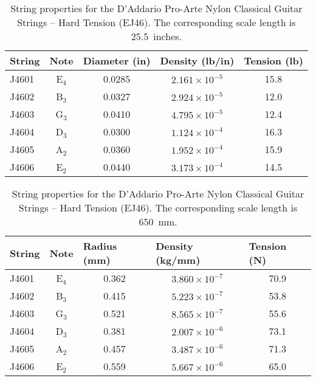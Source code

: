\begin{table}[htbp]
  \centering
  \caption{\label{tbl:ej46_ips} String properties for the D'Addario Pro-Arte Nylon Classical Guitar Strings -- Hard Tension (EJ46). The corresponding scale length is 25.5~inches.}
    \begin{tabular}{lcccc}
    \hline \hline
    String  & Note  & \multicolumn{1}{l}{Diameter (in)} & \multicolumn{1}{l}{Density (lb/in)} & \multicolumn{1}{l}{Tension (lb)} \\
    \hline
    J4601 & E$_4$  & 0.0285 & $2.161 \times 10^{-5}$ & 15.8 \\
    J4602 & B$_3$  & 0.0327 & $2.924 \times 10^{-5}$ & 12.0 \\
    J4603 & G$_3$  & 0.0410 & $4.795 \times 10^{-5}$ & 12.4 \\
    J4604 & D$_3$  & 0.0300 & $1.124 \times 10^{-4}$ & 16.3 \\
    J4605 & A$_2$  & 0.0360 & $1.952 \times 10^{-4}$ & 15.9 \\
    J4606 & E$_2$  & 0.0440 & $3.173 \times 10^{-4}$ & 14.5 \\
    \hline
    \end{tabular}%
  \label{tab:addlabel}%
\end{table}%

\begin{table}[htbp]
  \centering
  \caption{\label{tbl:ej46_mks} String properties for the D'Addario Pro-Arte Nylon Classical Guitar Strings -- Hard Tension (EJ46). The corresponding scale length is 650~mm.}
    \begin{tabular}{lcccc}
    \hline \hline
    String  & Note  & \multicolumn{1}{l}{Radius (mm)} & \multicolumn{1}{l}{Density (kg/mm)} & \multicolumn{1}{l}{Tension (N)} \\
    \hline
    J4601 & E$_4$  & 0.362 & $3.860 \times 10^{-7}$ & 70.9 \\
    J4602 & B$_3$  & 0.415 & $5.223 \times 10^{-7}$ & 53.8 \\
    J4603 & G$_3$  & 0.521 & $8.565 \times 10^{-7}$ & 55.6 \\
    J4604 & D$_3$  & 0.381 & $2.007 \times 10^{-6}$ & 73.1 \\
    J4605 & A$_2$  & 0.457 & $3.487 \times 10^{-6}$ & 71.3 \\
    J4606 & E$_2$  & 0.559 & $5.667 \times 10^{-6}$ & 65.0 \\
    \hline
    \end{tabular}%
  \label{tab:addlabel}%
\end{table}%


